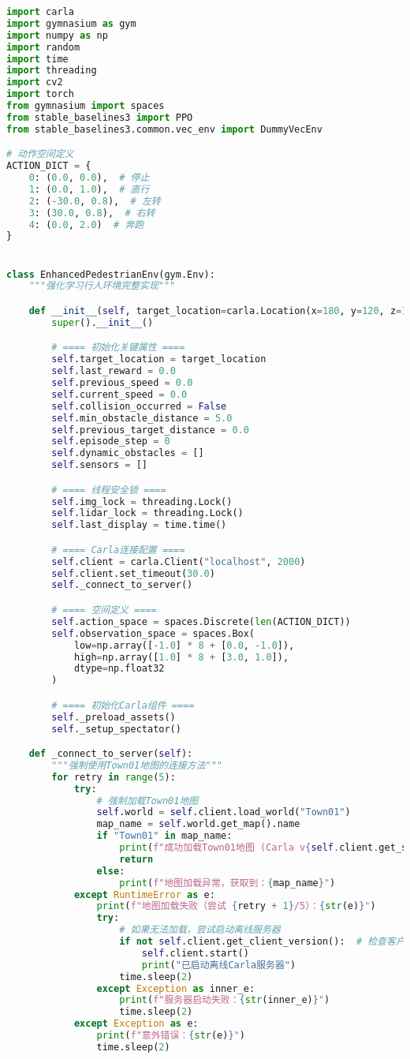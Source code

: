 \begin{lstlisting}[language=Python]
import carla
import gymnasium as gym
import numpy as np
import random
import time
import threading
import cv2
import torch
from gymnasium import spaces
from stable_baselines3 import PPO
from stable_baselines3.common.vec_env import DummyVecEnv

# 动作空间定义
ACTION_DICT = {
    0: (0.0, 0.0),  # 停止
    1: (0.0, 1.0),  # 直行
    2: (-30.0, 0.8),  # 左转
    3: (30.0, 0.8),  # 右转
    4: (0.0, 2.0)  # 奔跑
}


class EnhancedPedestrianEnv(gym.Env):
    """强化学习行人环境完整实现"""

    def __init__(self, target_location=carla.Location(x=180, y=120, z=1)):
        super().__init__()

        # ==== 初始化关键属性 ====
        self.target_location = target_location
        self.last_reward = 0.0
        self.previous_speed = 0.0
        self.current_speed = 0.0
        self.collision_occurred = False
        self.min_obstacle_distance = 5.0
        self.previous_target_distance = 0.0
        self.episode_step = 0
        self.dynamic_obstacles = []
        self.sensors = []

        # ==== 线程安全锁 ====
        self.img_lock = threading.Lock()
        self.lidar_lock = threading.Lock()
        self.last_display = time.time()

        # ==== Carla连接配置 ====
        self.client = carla.Client("localhost", 2000)
        self.client.set_timeout(30.0)
        self._connect_to_server()

        # ==== 空间定义 ====
        self.action_space = spaces.Discrete(len(ACTION_DICT))
        self.observation_space = spaces.Box(
            low=np.array([-1.0] * 8 + [0.0, -1.0]),
            high=np.array([1.0] * 8 + [3.0, 1.0]),
            dtype=np.float32
        )

        # ==== 初始化Carla组件 ====
        self._preload_assets()
        self._setup_spectator()

    def _connect_to_server(self):
        """强制使用Town01地图的连接方法"""
        for retry in range(5):
            try:
                # 强制加载Town01地图
                self.world = self.client.load_world("Town01")
                map_name = self.world.get_map().name
                if "Town01" in map_name:
                    print(f"成功加载Town01地图 (Carla v{self.client.get_server_version()})")
                    return
                else:
                    print(f"地图加载异常，获取到：{map_name}")
            except RuntimeError as e:
                print(f"地图加载失败（尝试 {retry + 1}/5）：{str(e)}")
                try:
                    # 如果无法加载，尝试启动离线服务器
                    if not self.client.get_client_version():  # 检查客户端连接
                        self.client.start()
                        print("已启动离线Carla服务器")
                    time.sleep(2)
                except Exception as inner_e:
                    print(f"服务器启动失败：{str(inner_e)}")
                    time.sleep(2)
            except Exception as e:
                print(f"意外错误：{str(e)}")
                time.sleep(2)


\end{lstlisting}
